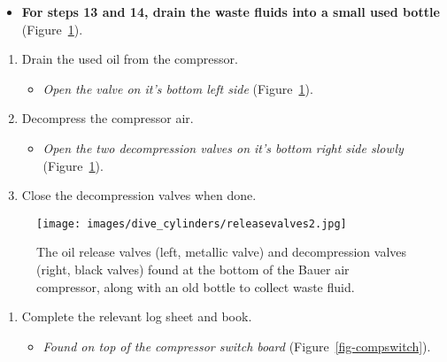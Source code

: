\documentclass[
  letterpaper,
  DIV=11,
  numbers=noendperiod]{scrreprt}
\providecommand{\tightlist}{%
  \setlength{\itemsep}{0pt}\setlength{\parskip}{0pt}}\usepackage{longtable,booktabs,array}
\begin{document}
\begin{itemize}
\tightlist
\item
  \textbf{For steps 13 and 14, drain the waste fluids into a small used
  bottle} (Figure~\ref{fig-releasevalves}).
\end{itemize}

\begin{enumerate}
\def\labelenumi{\arabic{enumi}.}
\setcounter{enumi}{14}
\tightlist
\item
  Drain the used oil from the compressor.

  \begin{itemize}
  \tightlist
  \item
    \emph{Open the valve on it's bottom left side}
    (Figure~\ref{fig-releasevalves}).
  \end{itemize}
\item
  Decompress the compressor air.

  \begin{itemize}
  \tightlist
  \item
    \emph{Open the two decompression valves on it's bottom right side
    slowly} (Figure~\ref{fig-releasevalves}).
  \end{itemize}
\item
  Close the decompression valves when done.
\end{enumerate}

\begin{figure}[H]

{\centering \texttt{[image: images/dive\_cylinders/releasevalves2.jpg]}

}

\caption{\label{fig-releasevalves}The oil release valves (left, metallic
valve) and decompression valves (right, black valves) found at the
bottom of the Bauer air compressor, along with an old bottle to collect
waste fluid.}

\end{figure}

\begin{enumerate}
\def\labelenumi{\arabic{enumi}.}
\setcounter{enumi}{17}
\tightlist
\item
  Complete the relevant log sheet and book.

  \begin{itemize}
  \tightlist
  \item
    \emph{Found on top of the compressor switch board}
    (Figure~\ref{fig-compswitch}).
  \end{itemize}
\end{enumerate}
\end{document}
